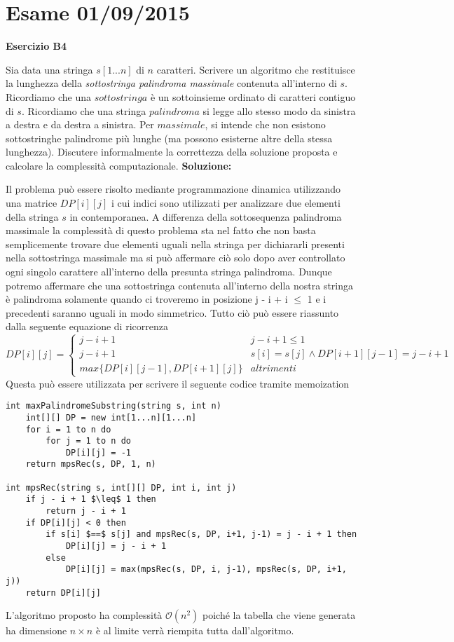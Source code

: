 \documentclass[../cheatSheetAlgoritmi.tex]{subfiles}
\begin{document}
\section{Esame 01/09/2015}
\textbf{Esercizio B4}

Sia data una stringa $s[1...n]$ di $n$ caratteri. Scrivere un algoritmo che restituisce la lunghezza della \emph{sottostringa palindroma massimale} contenuta all'interno di $s$. Ricordiamo che una $sottostringa$ è un sottoinsieme ordinato di caratteri contiguo di $s$. Ricordiamo che una stringa $palindroma$ si legge allo stesso modo da sinistra a destra e da destra a sinistra. Per $massimale$, si intende che non esistono sottostringhe palindrome più lunghe (ma possono esisterne altre della stessa lunghezza). Discutere informalmente la correttezza della soluzione proposta e calcolare la complessità computazionale.
\textbf{Soluzione:}

Il problema può essere risolto mediante programmazione dinamica utilizzando una matrice $DP[i][j]$ i cui indici sono utilizzati per analizzare due elementi della stringa $s$ in contemporanea. A differenza della sottosequenza palindroma massimale la complessità di questo problema sta nel fatto che non basta semplicemente trovare due elementi uguali nella stringa per dichiararli presenti nella sottostringa massimale ma si può affermare ciò solo dopo aver controllato ogni singolo carattere all'interno della presunta stringa palindroma. Dunque potremo affermare che una sottostringa contenuta all'interno della nostra stringa è palindroma solamente quando ci troveremo in posizione j - i + i $\leq$ 1 e i precedenti saranno uguali in modo simmetrico. Tutto ciò può essere riassunto dalla seguente equazione di ricorrenza
\begin{equation*}
  	DP[i][j]=\begin{cases}
  		j - i + 1 & \text{$j - i + 1 \leq 1$}\\
  		j - i + 1 & \text{$s[i] = s[j] \land DP[i+1][j-1] = j - i + 1$}\\
  		max\{DP[i][j-1], DP[i+1][j]\} & \text{$altrimenti$}
  	\end{cases}
\end{equation*}
Questa può essere utilizzata per scrivere il seguente codice tramite memoization
\begin{lstlisting}[caption=Sottostringa Palindroma Massimale]
int maxPalindromeSubstring(string s, int n)
	int[][] DP = new int[1...n][1...n]
	for i = 1 to n do
		for j = 1 to n do
			DP[i][j] = -1
	return mpsRec(s, DP, 1, n)
	
int mpsRec(string s, int[][] DP, int i, int j)
	if j - i + 1 $\leq$ 1 then
		return j - i + 1
	if DP[i][j] < 0 then
		if s[i] $==$ s[j] and mpsRec(s, DP, i+1, j-1) = j - i + 1 then
			DP[i][j] = j - i + 1
		else 
			DP[i][j] = max(mpsRec(s, DP, i, j-1), mpsRec(s, DP, i+1, j)) 
	return DP[i][j]
\end{lstlisting}
L'algoritmo proposto ha complessità $\mathcal{O}(n^{2})$ poiché la tabella che viene generata ha dimensione $n \times n$ è al limite verrà riempita tutta dall'algoritmo. 
 
\end{document}
